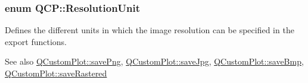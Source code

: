 \subsubsection[{\texorpdfstring{Resolution\+Unit}{ResolutionUnit}}]{\setlength{\rightskip}{0pt plus 5cm}enum {\bf Q\+C\+P\+::\+Resolution\+Unit}}\hypertarget{namespace_q_c_p_a715d46153da230990aa887d0f0602452}{}\label{namespace_q_c_p_a715d46153da230990aa887d0f0602452}
Defines the different units in which the image resolution can be specified in the export functions.

\begin{DoxySeeAlso}{See also}
\hyperlink{class_q_custom_plot_ac92cc9256d12f354b40a4be4600b5fb9}{Q\+Custom\+Plot\+::save\+Png}, \hyperlink{class_q_custom_plot_a76f0d278e630a711fa6f48048cfd83e4}{Q\+Custom\+Plot\+::save\+Jpg}, \hyperlink{class_q_custom_plot_ae3a86ed0795670e50afa21759d4fa13d}{Q\+Custom\+Plot\+::save\+Bmp}, \hyperlink{class_q_custom_plot_ad7723ce2edfa270632ef42b03a444352}{Q\+Custom\+Plot\+::save\+Rastered} 
\end{DoxySeeAlso}
